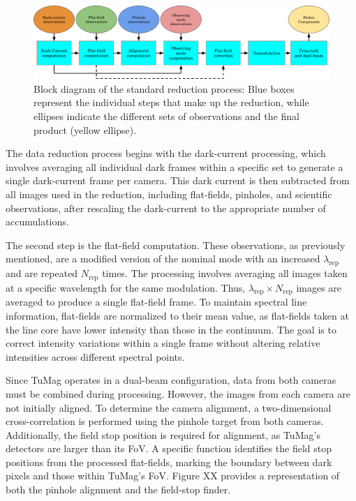 \begin{figure}[t]
  \includegraphics[width=\textwidth]{figures/Pipeline/block_diagram.pdf}
  \caption{
    Block diagram of the standard reduction process: Blue boxes represent the individual steps that make up the reduction, while ellipses indicate the different sets of observations and the final product (yellow ellipse). }
    \label{fig_pipeline: block_diagram}
\end{figure}

The data reduction process begins with the dark-current processing, which involves averaging all individual dark frames within a specific set to generate a single dark-current frame per camera. This dark current is then subtracted from all images used in the reduction, including flat-fields, pinholes, and scientific observations, after rescaling the dark-current to the appropriate number of accumulations.

The second step is the flat-field computation. These observations, as previously mentioned, are a modified version of the nominal mode with an increased $\lambda_{\text{rep}}$ and are repeated $N_{\text{rep}}$ times. The processing involves averaging all images taken at a specific wavelength for the same modulation. Thus, $\lambda_{\text{rep}} \times N_{\text{rep}}$ images are averaged to produce a single flat-field frame. To maintain spectral line information, flat-fields are normalized to their mean value, as flat-fields taken at the line core have lower intensity than those in the continuum. The goal is to correct intensity variations within a single frame without altering relative intensities across different spectral points.

Since TuMag operates in a dual-beam configuration, data from both cameras must be combined during processing. However, the images from each camera are not initially aligned. To determine the camera alignment, a two-dimensional cross-correlation is performed using the pinhole target from both cameras. Additionally, the field stop position is required for alignment, as TuMag's detectors are larger than its FoV. A specific function identifies the field stop positions from the processed flat-fields, marking the boundary between dark pixels and those within TuMag's FoV. Figure XX provides a representation of both the pinhole alignment and the field-stop finder.

